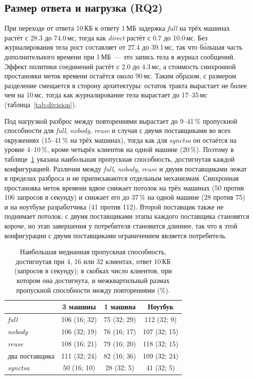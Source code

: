 \documentclass[conference,a4paper]{IEEEtran}
\newcommand{\newtext}[1]{{\color{blue}#1}}
\newcommand{\newred}[1]{{\color{red}#1}}
\begin{document}
\subsection{Размер ответа и нагрузка (RQ2)}

При переходе от ответа 10\,КБ к ответу 1\,МБ задержка \emph{full} на трёх машинах растёт с 28.3 до
74.0\,мс, тогда как \emph{direct} растёт с 0.7 до 10.0\,мс. Без журналирования тела рост составляет от 27.4
до 39.1\,мс, так что б\'{о}льшая часть дополнительного времени при 1\,МБ~--- это запись тела в журнал сообщений.
Эффект политики соединений растёт с 2.0 до 4.3\,мс, а стоимость синхронной простановки меток времени
остаётся около 90\,мс. \newtext{Таким образом, с размером разделение смещается в сторону архитектуры:
остаток тракта вырастает не более чем на 10\,мс, тогда как журналирование тела вырастает до 17--35\,мс
(таблица~\ref{tab:division}).}

Под нагрузкой разброс между повторениями вырастает до 9--41\,\% пропускной способности для \emph{full},
\emph{nobody}, \emph{reuse} и случая с двумя поставщиками во всех окружениях (15--41\,\% на трёх
машинах), тогда как для \emph{synctsa} он остаётся на уровне 4--10\,\%, кроме четырёх клиентов на одной машине
(20\,\%).
Поэтому в таблице~\ref{tab:load} указана наибольшая пропускная способность, достигнутая каждой конфигурацией.
Различия между \emph{full}, \emph{nobody}, \emph{reuse} и двумя поставщиками лежат в пределах разброса
и не приписываются отдельным механизмам. Синхронная простановка меток времени вдвое снижает потолок на трёх
машинах (50 против 106 запросов в секунду) \newtext{и снижает его до 37\,\% на одной машине (28 против 75) и на ноутбуке разработчика (41 против 112)}. Второй поставщик также не поднимает потолок:
с двумя поставщиками этапы каждого поставщика становятся короче, но этап завершения у потребителя
становится длиннее, так что \newred{в этой конфигурации с двумя поставщиками} ограничением является потребитель.

\begin{table}[!htb]
\centering\footnotesize
\setlength{\tabcolsep}{4pt}
\caption{Наибольшая медианная пропускная способность, достигнутая при 4, 16 или 32 клиентах, ответ 10\,КБ (запросов в
секунду); в скобках число клиентов, при котором она достигнута, и межквартильный размах
пропускной способности между повторениями (\%).}
\label{tab:load}
\begin{tabular}{@{}lccc@{}}
\toprule
& 3 машины & 1 машина & Ноутбук \\
\midrule
\emph{full} & 106 (16; 32) & 75 (32; 29) & 112 (32; 9) \\
\emph{nobody} & 106 (32; 19) & 76 (16; 17) & 107 (32; 15) \\
\emph{reuse} & 108 (16; 21) & 79 (16; 20) & 118 (32; 15) \\
два поставщика & 111 (32; 24) & 82 (16; 36) & 109 (32; 24) \\
\emph{synctsa} & 50 (16; 10) & 28 (32; 5) & 41 (32; 5) \\
\bottomrule
\end{tabular}
\end{table}
\end{document}
